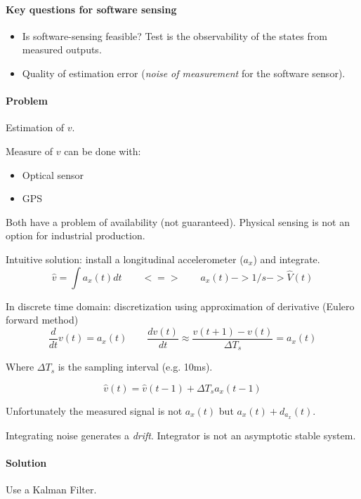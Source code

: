 
\paragraph{Key questions for software sensing}

\begin{itemize}
    \item Is software-sensing feasible? Test is the observability of the states from measured outputs.
    \item Quality of estimation error (\emph{noise of measurement} for the software sensor).
\end{itemize}

\begin{example}

    \paragraph{Problem} Estimation of $v$.

    Measure of $v$ can be done with:
    \begin{itemize}
        \item Optical sensor
        \item GPS
    \end{itemize}
    Both have a problem of availability (not guaranteed). Physical sensing is not an option for industrial production.

    Intuitive solution: install a longitudinal accelerometer ($a_x$) and integrate.
    \[
        \hat{v} = \int a_x(t) dt \qquad <=> \qquad a_x(t) -> 1/s -> \hat{V}(t)
    \]

    In discrete time domain: discretization using approximation of derivative (Eulero forward method)
    \[
        \frac{d}{dt} v(t) = a_x(t) \qquad \frac{dv(t)}{dt} \approx \frac{v(t+1)-v(t)}{\Delta T_s} = a_x(t)
    \]

    Where $\Delta T_s$ is the sampling interval (e.g. 10ms).

    \[
        \hat{v}(t) = \hat{v}(t-1) + \Delta T_s a_x(t-1)
    \]


    Unfortunately the measured signal is not $a_x(t)$ but $a_x(t)+d_{a_x}(t)$.


    Integrating noise generates a \emph{drift}. Integrator is not an asymptotic stable system.


    \paragraph{Solution} Use a Kalman Filter.

\end{example}

